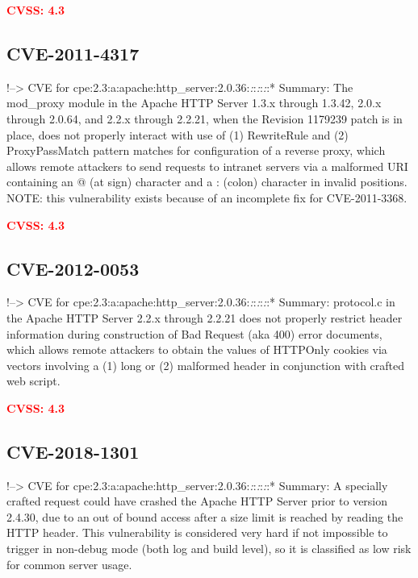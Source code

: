 \documentclass[a4paper, 12pt]{article}
\begin{document}
\textbf{\textcolor{red}{CVSS: 4.3}}

\hypertarget{cve-2011-4317}{%
\subsection{CVE-2011-4317}\label{cve-2011-4317}}

!--\textgreater{} CVE for
cpe:2.3:a:apache:http\_server:2.0.36:\emph{:}:\emph{:}:\emph{:}:*
Summary: The mod\_proxy module in the Apache HTTP Server 1.3.x through
1.3.42, 2.0.x through 2.0.64, and 2.2.x through 2.2.21, when the
Revision 1179239 patch is in place, does not properly interact with use
of (1) RewriteRule and (2) ProxyPassMatch pattern matches for
configuration of a reverse proxy, which allows remote attackers to send
requests to intranet servers via a malformed URI containing an @ (at
sign) character and a : (colon) character in invalid positions. NOTE:
this vulnerability exists because of an incomplete fix for
CVE-2011-3368.

\textbf{\textcolor{red}{CVSS: 4.3}}

\hypertarget{cve-2012-0053}{%
\subsection{CVE-2012-0053}\label{cve-2012-0053}}

!--\textgreater{} CVE for
cpe:2.3:a:apache:http\_server:2.0.36:\emph{:}:\emph{:}:\emph{:}:*
Summary: protocol.c in the Apache HTTP Server 2.2.x through 2.2.21 does
not properly restrict header information during construction of Bad
Request (aka 400) error documents, which allows remote attackers to
obtain the values of HTTPOnly cookies via vectors involving a (1) long
or (2) malformed header in conjunction with crafted web script.

\textbf{\textcolor{red}{CVSS: 4.3}}

\hypertarget{cve-2018-1301}{%
\subsection{CVE-2018-1301}\label{cve-2018-1301}}

!--\textgreater{} CVE for
cpe:2.3:a:apache:http\_server:2.0.36:\emph{:}:\emph{:}:\emph{:}:*
Summary: A specially crafted request could have crashed the Apache HTTP
Server prior to version 2.4.30, due to an out of bound access after a
size limit is reached by reading the HTTP header. This vulnerability is
considered very hard if not impossible to trigger in non-debug mode
(both log and build level), so it is classified as low risk for common
server usage.
\end{document}
